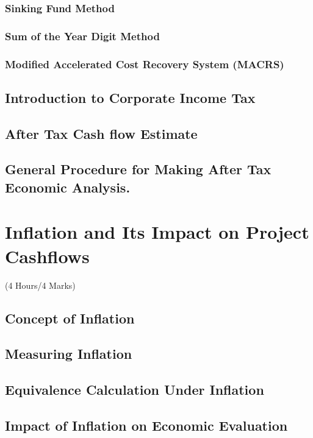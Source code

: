\documentclass[12pt]{article}
\begin{document}
	\subsubsection{Sinking Fund Method}
	\subsubsection{Sum of the Year Digit Method}
	\subsubsection{Modified Accelerated Cost Recovery System (MACRS)}
	\subsection{Introduction to Corporate Income Tax}
	\subsection{After Tax Cash flow Estimate}
	\subsection{General Procedure for Making After Tax Economic Analysis.}

	\pagebreak
\section{Inflation and Its Impact on Project Cashflows}
	\begin{center}(4 Hours/4 Marks)\end{center}
	\subsection{Concept of Inflation}
	\subsection{Measuring Inflation}
	\subsection{Equivalence Calculation Under Inflation}
	\subsection{Impact of Inflation on Economic Evaluation}
\end{document}
